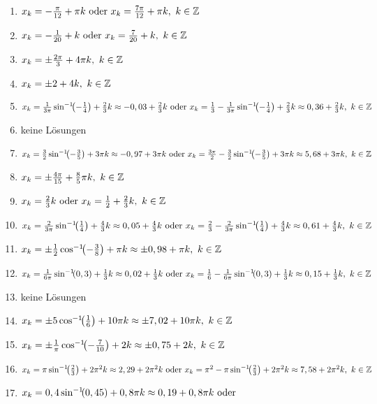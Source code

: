 \begin{Answer}[ref=sincosGleichungenAllgA1]
	\begin{enumerate}[label=\alph*)]
		\item \(x_k=-\frac{\pi}{12} +\pi k\text{ oder }x_k=\frac{7\pi}{12} +\pi k,\ k\in\mathbb{Z}\)
		\item \(x_k=-\frac{1}{20} + k\text{ oder }x_k=\frac{7}{20} + k,\ k\in\mathbb{Z}\)
		\item \(x_k=\pm \frac{2\pi}{3} +4\pi k,\ k\in\Z\)
		\item \(x_k=\pm 2 +4 k,\ k\in\Z\)
		\item \(x_k=\frac{1}{3\pi}\arcsinn{-\frac{1}{4}} +\frac{2}{3} k\approx -0,03+\frac{2}{3} k\text{ oder }x_k=\frac{1}{3}-\frac{1}{3\pi}\arcsinn{-\frac{1}{4}} +\frac{2}{3} k\approx 0,36+\frac{2}{3} k,\ k\in\Z\)
		\item keine Lösungen
		\item \(x_k=\frac{3}{2}\arcsinn{-\frac{3}{5}} +3\pi k\approx -0,97+3\pi k\text{ oder }x_k=\frac{3\pi}{2}-\frac{3}{2}\arcsinn{-\frac{3}{5}} +3\pi k\approx 5,68+3\pi k,\ k\in\Z\)
		\item \(x_k=\pm \frac{4\pi}{15} +\frac{8}{5}\pi k,\ k\in\mathbb{Z}\)
		\item \(x_k=\frac{2}{3} k\text{ oder }x_k=\frac{1}{2} +\frac{2}{3} k,\ k\in\mathbb{Z}\)
		\item \(x_k=\frac{2}{3\pi}\arcsinn{\frac{1}{4}} +\frac{4}{3} k\approx 0,05+\frac{4}{3} k\text{ oder }x_k=\frac{2}{3}-\frac{2}{3\pi}\arcsinn{\frac{1}{4}} +\frac{4}{3} k\approx 0,61+\frac{4}{3} k,\ k\in\Z\)
		\item \(x_k=\pm \frac{1}{2}\arccoss{-\frac{3}{8}} +\pi k\approx\pm 0,98 +\pi k,\ k\in\Z\)
		\item \(x_k=\frac{1}{6\pi}\arcsinn{0,3} +\frac{1}{3} k\approx 0,02+\frac{1}{3} k\text{ oder }x_k=\frac{1}{6}-\frac{1}{6\pi}\arcsinn{0,3} +\frac{1}{3} k\approx 0,15+\frac{1}{3} k,\ k\in\Z\)
		\item keine Lösungen
		\item \(x_k=\pm 5\arccoss{\frac{1}{6}} +10\pi k\approx\pm 7,02 +10\pi k,\ k\in\Z\)
		\item \(x_k=\pm \frac{1}{\pi}\arccoss{-\frac{7}{10}} +2k\approx\pm 0,75 +2k,\ k\in\Z\)
		\item \(x_k=\pi\arcsinn{\frac{2}{3}} +2\pi^2 k\approx 2,29+2\pi^2 k\text{ oder }x_k=\pi^2-\pi\arcsinn{\frac{2}{3}} +2\pi^2 k\approx 7,58+2\pi^2 k,\ k\in\Z\)
		\item \(x_k=0,4\arcsinn{0,45} +0,8\pi k\approx 0,19+0,8\pi k\text{ oder }\)


\end{enumerate}
\end{Answer}
